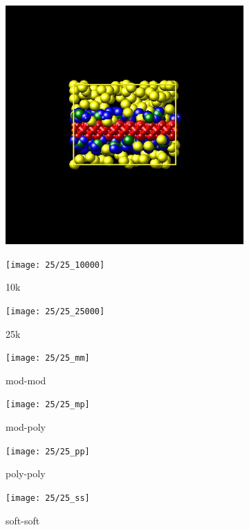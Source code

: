 \documentclass[a4paper]{article}
\begin{document}
\begin{figure}[H]
\begin{subfigure}{0.3\textwidth}
  \centering
  \includegraphics[width=\linewidth,keepaspectratio]{start}
  \caption{}
\end{subfigure}
\begin{subfigure}{0.3\textwidth}
  \centering
  \texttt{[image: 25/25\_10000]}
  \caption{10k}
\end{subfigure}
\begin{subfigure}{0.3\textwidth}
  \centering
  \texttt{[image: 25/25\_25000]}
  \caption{25k}
\end{subfigure}
\caption{}
\label{fig_1}
\end{figure}

\begin{figure}[H]
\begin{subfigure}{0.24\textwidth}
  \centering
  \texttt{[image: 25/25\_mm]}
  \caption{mod-mod}
\end{subfigure}
\begin{subfigure}{0.24\textwidth}
  \centering
  \texttt{[image: 25/25\_mp]}
  \caption{mod-poly}
\end{subfigure}
\begin{subfigure}{0.24\textwidth}
  \centering
  \texttt{[image: 25/25\_pp]}
  \caption{poly-poly}
\end{subfigure}
\begin{subfigure}{0.24\textwidth}
  \centering
  \texttt{[image: 25/25\_ss]}
  \caption{soft-soft}
\end{subfigure}
\caption{}
\label{fig_1}
\end{figure}
\end{document}
